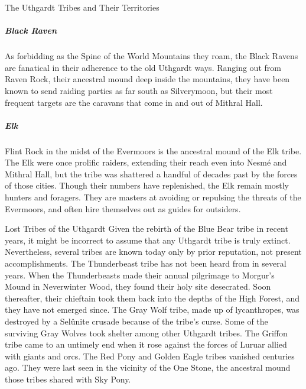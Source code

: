 \documentclass[10pt,a4paper,twoside,twocolumn,openany,bg=print,nodeprecatedcode]{dndbook}
\begin{document}
\begin{DndComment}{The Uthgardt Tribes and Their Territories}
\subparagraph{Black Raven}
As forbidding as the Spine of the World Mountains they roam, the Black Ravens are fanatical in their adherence to the old Uthgardt ways. Ranging out from Raven Rock, their ancestral mound deep inside the mountains, they have been known to send raiding parties as far south as Silverymoon, but their most frequent targets are the caravans that come in and out of Mithral Hall.
\subparagraph{Elk}
Flint Rock in the midst of the Evermoors is the ancestral mound of the Elk tribe. The Elk were once prolific raiders, extending their reach even into Nesmé and Mithral Hall, but the tribe was shattered a handful of decades past by the forces of those cities. Though their numbers have replenished, the Elk remain mostly hunters and foragers. They are masters at avoiding or repulsing the threats of the Evermoors, and often hire themselves out as guides for outsiders.
\end{DndComment}

\begin{DndComment}{Lost Tribes of the Uthgardt}
Given the rebirth of the Blue Bear tribe in recent years, it might be incorrect to assume that any Uthgardt tribe is truly extinct. Nevertheless, several tribes are known today only by prior reputation, not present accomplishments.
The Thunderbeast tribe has not been heard from in several years. When the Thunderbeasts made their annual pilgrimage to Morgur's Mound in Neverwinter Wood, they found their holy site desecrated. Soon thereafter, their chieftain took them back into the depths of the High Forest, and they have not emerged since.
The Gray Wolf tribe, made up of lycanthropes, was destroyed by a Selûnite crusade because of the tribe's curse. Some of the surviving Gray Wolves took shelter among other Uthgardt tribes.
The Griffon tribe came to an untimely end when it rose against the forces of Luruar allied with giants and orcs.
The Red Pony and Golden Eagle tribes vanished centuries ago. They were last seen in the vicinity of the One Stone, the ancestral mound those tribes shared with Sky Pony.
\end{DndComment}
\end{document}
